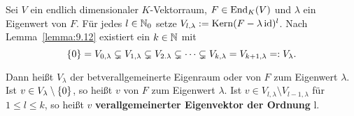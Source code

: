 \begin{definition}
	\label{def:9.13}
	Sei $V$ ein endlich dimensionaler $K$-Vektorraum, $F \in \operatorname{End}_K(V)$ und $\lambda$ ein Eigenwert von $F$.
	Für jedes $l \in \mathbb{N}_0$ setze $V_{l,\lambda} := \operatorname{Kern}(F-\lambda \operatorname{id})^l$.
	Nach Lemma~\ref{lemma:9.12} existiert ein $k \in \mathbb{N}$ mit
	\[
		\{0\} = V_{0,\lambda} \subsetneq V_{1,\lambda} \subsetneq V_{2.\lambda} \subsetneq \cdots \subsetneq V_{k,\lambda} = V_{k+1,\lambda} =: V_\lambda.
	\]
	  
	Dann heißt $V_\lambda$ der bet{verallgemeinerte Eigenraum} oder  von $F$ zum Eigenwert $\lambda$. 
	Ist $v \in V_\lambda \setminus \{0\}$, so heißt $v$  von $F$ zum Eigenwert $\lambda$.
	Ist $v \in V_{l,\lambda} \setminus V_{l-1,\lambda}$ für $1 \leq l \leq k$, so heißt $v$ \textbf{verallgemeinerter Eigenvektor der Ordnung} l.
\end{definition}


